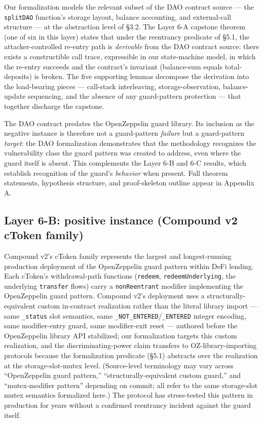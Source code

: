 Our formalization models the relevant subset of the DAO contract source
--- the \texttt{splitDAO} function's storage layout, balance accounting,
and external-call structure --- at the abstraction level of §3.2. The
Layer 6-A capstone theorem (one of six in this layer) states that under
the reentrancy predicate of §5.1, the attacker-controlled re-entry path
is \emph{derivable} from the DAO contract source: there exists a
constructible call trace, expressible in our state-machine model, in
which the re-entry succeeds and the contract's invariant (balance-sum
equals total-deposits) is broken. The five supporting lemmas decompose
the derivation into the load-bearing pieces --- call-stack interleaving,
storage-observation, balance-update sequencing, and the absence of any
guard-pattern protection --- that together discharge the capstone.

The DAO contract predates the OpenZeppelin guard library. Its inclusion
as the negative instance is therefore not a guard-pattern \emph{failure}
but a guard-pattern \emph{target}: the DAO formalization demonstrates
that the methodology recognizes the vulnerability class the guard
pattern was created to address, even where the guard itself is absent.
This complements the Layer 6-B and 6-C results, which establish
recognition of the guard's \emph{behavior} when present. Full theorem
statements, hypothesis structure, and proof-skeleton outline appear in
Appendix A.

\subsection{Layer 6-B: positive instance (Compound v2 cToken
family)}\label{layer-6-b-positive-instance-compound-v2-ctoken-family}

Compound v2's cToken family represents the largest and longest-running
production deployment of the OpenZeppelin guard pattern within DeFi
lending. Each cToken's withdrawal-path functions (\texttt{redeem},
\texttt{redeemUnderlying}, the underlying \texttt{transfer} flows) carry
a \texttt{nonReentrant} modifier implementing the OpenZeppelin guard
pattern. Compound v2's deployment uses a structurally-equivalent custom
in-contract realization rather than the literal library import --- same
\texttt{\_status} slot semantics, same
\texttt{\_NOT\_ENTERED}/\texttt{\_ENTERED} integer encoding, same
modifier-entry guard, same modifier-exit reset --- authored before the
OpenZeppelin library API stabilized; our formalization targets this
custom realization, and the discriminating-power claim transfers to
OZ-library-importing protocols because the formalization predicate
(§5.1) abstracts over the realization at the storage-slot-mutex level.
(Source-level terminology may vary across ``OpenZeppelin guard
pattern,'' ``structurally-equivalent custom guard,'' and
``mutex-modifier pattern'' depending on commit; all refer to the same
storage-slot mutex semantics formalized here.) The protocol has
stress-tested this pattern in production for years without a confirmed
reentrancy incident against the guard itself.

